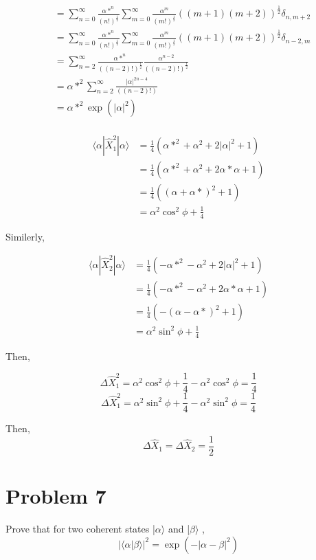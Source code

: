 \documentclass[a4paper,11pt]{article}
\begin{document}
\begin{equation*}
\begin{split}
& = \sum_{n=0}^{\infty}\frac{\alpha*^n}{(n!)^\frac{1}{2}}   \sum_{m=0}^{\infty}\frac{\alpha^m}{(m!)^\frac{1}{2}}((m+1)(m+2))^\frac{1}{2}\delta_{n, m+2} \\
& = \sum_{n=0}^{\infty}\frac{\alpha*^n}{(n!)^\frac{1}{2}}   \sum_{m=0}^{\infty}\frac{\alpha^m}{(m!)^\frac{1}{2}}((m+1)(m+2))^\frac{1}{2}\delta_{n-2,m} \\
& = \sum_{n=2}^{\infty}\frac{\alpha*^n}{((n-2)!)^\frac{1}{2}}   \frac{\alpha^{n-2}}{((n-2)!)^\frac{1}{2}} \\
& = \alpha*^2\sum_{n=2}^{\infty}\frac{|\alpha|^{2n-4}}{((n-2)!)} \\
& = \alpha*^2 \exp\left(|\alpha|^2\right)\\
\end{split}
\end{equation*}

\begin{equation*}
\begin{split}
\langle\alpha|\hat{X}_1^2|\alpha\rangle & = \frac{1}{4} (\alpha*^2+\alpha^2+2|\alpha|^2 +1) \\
& = \frac{1}{4} (\alpha*^2+\alpha^2+2\alpha * \alpha +1) \\
& = \frac{1}{4} ((\alpha+\alpha*)^2 +1) \\
& = \alpha^2\cos^2\phi + \frac{1}{4}
\end{split}
\end{equation*}

Similerly,

\begin{equation*}
\begin{split}
\langle\alpha|\hat{X}_2^2|\alpha\rangle & = \frac{1}{4} (-\alpha*^2-\alpha^2+2|\alpha|^2 +1) \\
& = \frac{1}{4} (-\alpha*^2-\alpha^2+2\alpha * \alpha +1) \\
& = \frac{1}{4} (-(\alpha-\alpha*)^2 +1) \\
& = \alpha^2\sin^2\phi + \frac{1}{4}
\end{split}
\end{equation*}

Then,

$$\Delta \hat{X}_1^2 = \alpha^2\cos^2\phi + \frac{1}{4} - \alpha^2\cos^2\phi = \frac{1}{4}$$
$$\Delta \hat{X}_1^2 = \alpha^2\sin^2\phi + \frac{1}{4} - \alpha^2\sin^2\phi = \frac{1}{4}$$

Then, $$\Delta\hat{X}_1 = \Delta\hat{X}_2 = \frac{1}{2}$$
\section*{Problem 7}
\label{sec:org59a5f45}
Prove that for two coherent states |\(\alpha \rangle\)  and |\(\beta \rangle\) ,
$$|\langle \alpha|\beta\rangle |^2=\exp(-|\alpha-\beta|^2)$$
\end{document}
